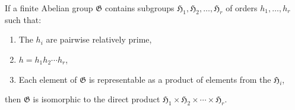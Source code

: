 If a finite Abelian group $\mathfrak{G}$ contains subgroups $\mathfrak{H}_1, \mathfrak{H}_2, \ldots, \mathfrak{H}_r$ of orders $h_1, \ldots, h_r$ such that:
\begin{enumerate}
\item The $h_i$ are pairwise relatively prime,
\item $h = h_1 h_2 \cdots h_r$,
\item Each element of $\mathfrak{G}$ is representable as a product of elements from the $\mathfrak{H}_i$,
\end{enumerate}
then $\mathfrak{G}$ is isomorphic to the direct product $\mathfrak{H}_1 \times \mathfrak{H}_2 \times \cdots \times \mathfrak{H}_r$.
